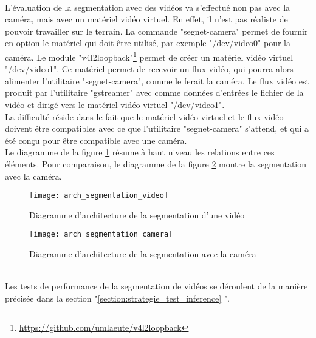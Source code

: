 ﻿
\vspace{0.5\baselineskip}
\\
\noindent L'évaluation de la segmentation avec des vidéos va s'effectué non pas avec la caméra, mais avec un matériel vidéo virtuel. En effet, il n'est pas réaliste de pouvoir travailler sur le terrain. La commande "segnet-camera" permet de fournir en option le matériel qui doit être utilisé, par exemple "/dev/video0" pour la caméra. Le module "v4l2loopback"\footnote{\url{https://github.com/umlaeute/v4l2loopback}} permet de créer un matériel vidéo virtuel "/dev/video1". Ce matériel permet de recevoir un flux vidéo, qui pourra alors alimenter l'utilitaire "segnet-camera", comme le ferait la caméra. Le flux vidéo est produit par l'utilitaire "gstreamer" avec comme données d'entrées le fichier de la vidéo et dirigé vers le matériel vidéo virtuel "/dev/video1".
\vspace{0.5\baselineskip}
\\
\noindent La difficulté réside dans le fait que le matériel vidéo virtuel et le flux vidéo doivent être compatibles avec ce que l'utilitaire "segnet-camera" s'attend, et qui a été conçu pour être compatible avec une caméra. 
\vspace{0.5\baselineskip}
\\
\noindent Le diagramme de la figure \ref{fig:arch_segmentation_video} résume à haut niveau les relations entre ces éléments. Pour comparaison, le diagramme de la figure \ref{fig:arch_segmentation_camera} montre la segmentation avec la caméra. 
\begin{figure}[H]
    \centering
    \texttt{[image: arch\_segmentation\_video]}
    \caption[Diagramme d'architecture de la segmentation d'une vidéo]{Diagramme d'architecture de la segmentation d'une vidéo}
    \label{fig:arch_segmentation_video}
\end{figure}
\begin{figure}[H]
    \centering
    \texttt{[image: arch\_segmentation\_camera]}
    \caption[Diagramme d'architecture de la segmentation avec la caméra]{Diagramme d'architecture de la segmentation avec la caméra}
    \label{fig:arch_segmentation_camera}
\end{figure}
\vspace{0.5\baselineskip}
\\
\noindent Les tests de performance de la segmentation de vidéos se déroulent de la manière précisée dans la section "\ref{section:strategie_test_inference} ". 
